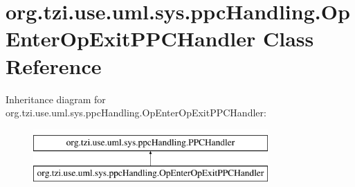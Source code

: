 \hypertarget{classorg_1_1tzi_1_1use_1_1uml_1_1sys_1_1ppc_handling_1_1_op_enter_op_exit_p_p_c_handler}{\section{org.\-tzi.\-use.\-uml.\-sys.\-ppc\-Handling.\-Op\-Enter\-Op\-Exit\-P\-P\-C\-Handler Class Reference}
\label{classorg_1_1tzi_1_1use_1_1uml_1_1sys_1_1ppc_handling_1_1_op_enter_op_exit_p_p_c_handler}
}
Inheritance diagram for org.\-tzi.\-use.\-uml.\-sys.\-ppc\-Handling.\-Op\-Enter\-Op\-Exit\-P\-P\-C\-Handler\-:\begin{figure}[H]
\begin{center}
\leavevmode
\includegraphics[height=2.000000cm]{classorg_1_1tzi_1_1use_1_1uml_1_1sys_1_1ppc_handling_1_1_op_enter_op_exit_p_p_c_handler}
\end{center}
\end{figure}
